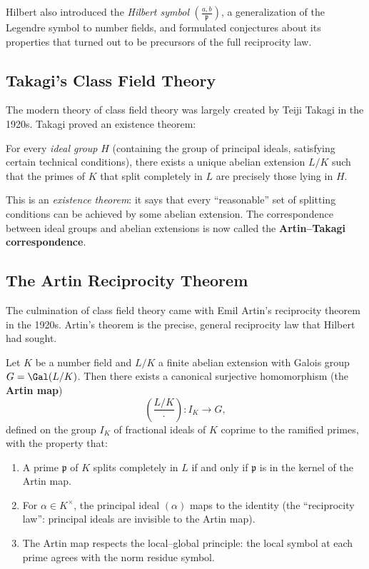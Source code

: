 Hilbert also introduced the \emph{Hilbert symbol} $\left(\frac{a,b}{\mathfrak{p}}\right)$, a generalization of the Legendre symbol to number fields, and formulated conjectures about its properties that turned out to be precursors of the full reciprocity law.

\subsection{Takagi's Class Field Theory}

The modern theory of class field theory was largely created by Teiji Takagi in the 1920s. Takagi proved an existence theorem:

\begin{theorem}[Takagi, 1920]\label{thm:takagi}
For every \emph{ideal group} $H$ (containing the group of principal ideals, satisfying certain technical conditions), there exists a unique abelian extension $L/K$ such that the primes of $K$ that split completely in $L$ are precisely those lying in $H$.
\end{theorem}

This is an \emph{existence theorem}: it says that every ``reasonable'' set of splitting conditions can be achieved by some abelian extension. The correspondence between ideal groups and abelian extensions is now called the \textbf{Artin--Takagi correspondence}.

\subsection{The Artin Reciprocity Theorem}

The culmination of class field theory came with Emil Artin's reciprocity theorem in the 1920s. Artin's theorem is the precise, general reciprocity law that Hilbert had sought.

\begin{theorem}\label{thm:artin-reciprocity}
Let $K$ be a number field and $L/K$ a finite abelian extension with Galois group $G = \Gal(L/K)$. Then there exists a canonical surjective homomorphism (the \textbf{Artin map})
\[
    \left(\frac{L/K}{\cdot}\right) : I_K \to G,
\]
defined on the group $I_K$ of fractional ideals of $K$ coprime to the ramified primes, with the property that:
\begin{enumerate}
    \item A prime $\mathfrak{p}$ of $K$ splits completely in $L$ if and only if $\mathfrak{p}$ is in the kernel of the Artin map.
    \item For $\alpha \in K^\times$, the principal ideal $(\alpha)$ maps to the identity (the ``reciprocity law'': principal ideals are invisible to the Artin map).
    \item The Artin map respects the local--global principle: the local symbol at each prime agrees with the norm residue symbol.
\end{enumerate}
\end{theorem}

